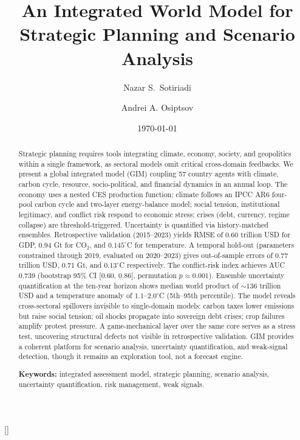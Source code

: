 \documentclass[a4paper,fleqn]{cas-sc}
\begin{document}
\let\WriteBookmarks\relax
\def\floatpagepagefraction{1}
\def\textpagefraction{.001}



\title[mode = title]{An Integrated World Model for Strategic Planning and Scenario Analysis}
\author[1]{Nazar S.~Sotiriadi}
\cormark[1]
\author[1,2]{Andrei A. Osiptsov}[]

\date{\today}

\maketitle

\begin{abstract}
\noindent
Strategic planning requires tools integrating climate, economy, society, and geopolitics within a single framework, as sectoral models omit critical cross-domain feedbacks. We present a global integrated model (GIM) coupling 57 country agents with climate, carbon cycle, resource, socio-political, and financial dynamics in an annual loop. The economy uses a nested CES production function; climate follows an IPCC AR6 four-pool carbon cycle and two-layer energy-balance model; social tension, institutional legitimacy, and conflict risk respond to economic stress; crises (debt, currency, regime collapse) are threshold-triggered. Uncertainty is quantified via history-matched ensembles. Retrospective validation (2015--2023) yields RMSE of 0.60 trillion USD for GDP, 0.94 Gt for CO$_2$, and $0.145^{\circ}$C for temperature. A temporal hold-out (parameters constrained through 2019, evaluated on 2020--2023) gives out-of-sample errors of 0.77 trillion USD, 0.71 Gt, and $0.13^{\circ}$C respectively. The conflict-risk index achieves AUC 0.739 (bootstrap 95\% CI [0.60, 0.86], permutation $p\approx 0.001$). Ensemble uncertainty quantification at the ten-year horizon shows median world product of ${\sim}136$ trillion USD and a temperature anomaly of $1.1$--$2.0^{\circ}$C (5th--95th percentile). The model reveals cross-sectoral spillovers invisible to single-domain models: carbon taxes lower emissions but raise social tension; oil shocks propagate into sovereign debt crises; crop failures amplify protest pressure. A game-mechanical layer over the same core serves as a stress test, uncovering structural defects not visible in retrospective validation. GIM provides a coherent platform for scenario analysis, uncertainty quantification, and weak-signal detection, though it remains an exploration tool, not a forecast engine.

\medskip
\noindent\textbf{Keywords:} integrated assessment model, strategic planning, scenario analysis, uncertainty quantification, risk management, weak signals.
\end{abstract}
\end{document}
